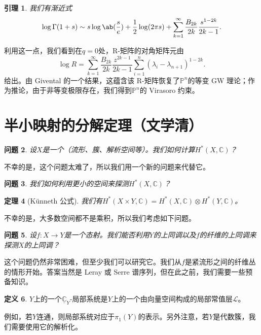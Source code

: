 \documentclass{amsart}
\newtheorem{thm}{定理}[section]
\newtheorem{lem}[thm]{引理}
\newtheorem{quest}[thm]{问题}
\theoremstyle{definition}
\newtheorem{defn}[thm]{定义}
\theoremstyle{remark}
\theoremstyle{plain}
\theoremstyle{definition}
\theoremstyle{remark}
\newcommand{\C}{\mathbb{C}}
\renewcommand{\P}{\mathbb{P}}
\newcommand{\mc}[1]{\mathcal{#1}}
\newcommand{\ul}[1]{\underline{#1}}
\newcommand{\1}{\mathbf{1}}
\newcommand{\2}{\mathbf{2}}
\newcommand{\3}{\mathbf{3}}
\begin{document}
\begin{lem}
    我们有渐近式
    \[ \log \Gamma(1+s) \sim s \log \ab(\frac{s}{e}) + \frac{1}{2} \log(2\pi s) + \sum_{k=1}^{\infty} \frac{B_{2k}}{2k} \frac{s^{1-2k}}{2k-1}. \]
\end{lem}
利用这一点，我们看到在\(q = 0\)处，R-矩阵的对角矩阵元由
\[ \log R = \sum_{k=1}^{\infty} \frac{B_{2k}}{2k} \frac{z^{2k-1}}{2k-1} \sum_{i =1}^n (\lambda_i - \lambda_{n+1})^{1-2k}. \]
给出。由 Givental 的一个结果，这蕴含该 R-矩阵恢复了\(\P^n\)的等变 GW 理论；作为推论，由于非等变极限存在，我们得到\(\P^n\)的 Virasoro 约束。


\section{半小映射的分解定理（文学清）}%
\label{sec:Decomposition theorem for semi-small maps (Xueqing Wen)}

\begin{quest}
    设\(X\)是一个（流形、簇、解析空间等）。我们如何计算\(H^*(X, \C)\)？
\end{quest}

不幸的是，这个问题太难了，所以我们用一个新的问题来代替它。

\begin{quest}
    我们如何利用更小的空间来探测\(H^*(X, \C)\)？
\end{quest}

\begin{thm}[K\"unneth 公式]
    我们有\(H^*(X \times Y, \C) = H^*(X, \C) \otimes H^*(Y, \C)\)。
\end{thm}

不幸的是，大多数空间都不是乘积，所以我们考虑如下问题。

\begin{quest}
    设\(f \colon X \to Y\)是一个态射。我们能否利用\(Y\)的上同调以及\(f\)的纤维的上同调来探测\(X\)的上同调？
\end{quest}

这个问题仍然非常困难，但至少我们可以研究它。我们从\(f\)是紧流形之间的纤维丛的情形开始。答案当然是 Leray 或 Serre 谱序列，但在此之前，我们需要一些预备知识。

\begin{defn}
    \(Y\)上的一个\(\ul{\C}_Y\)-局部系统是\(Y\)上的一个由向量空间构成的局部常值层\(\mc{L}\)。
\end{defn}

例如，若\(Y\)连通，则局部系统对应于\(\pi_1(Y)\)的表示。另外注意，若\(Y\)是代数簇，我们需要使用它的解析化。
\end{document}
